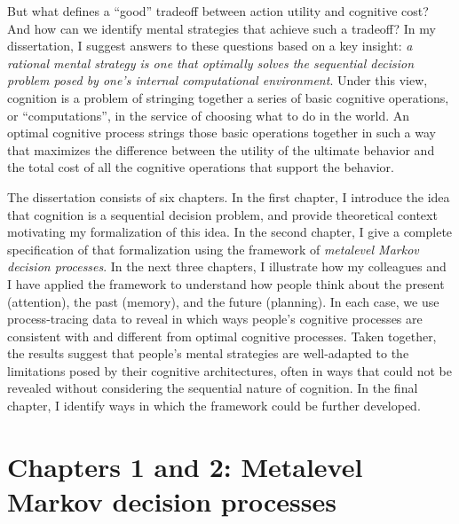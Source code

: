 \documentclass[dsingle]{memo}
\begin{document}
But what defines a ``good'' tradeoff between action utility and cognitive cost? And how can we identify mental strategies that achieve such a tradeoff? In my dissertation, I suggest answers to these questions based on a key insight: \emph{a rational mental strategy is one that optimally solves the sequential decision problem posed by one's internal computational environment}. Under this view, cognition is a problem of stringing together a series of basic cognitive operations, or ``computations'', in the service of choosing what to do in the world. An optimal cognitive process strings those basic operations together in such a way that maximizes the difference between the utility of the ultimate behavior and the total cost of all the cognitive operations that support the behavior.

The dissertation consists of six chapters. In the first chapter, I introduce the idea that cognition is a sequential decision problem, and provide theoretical context motivating my formalization of this idea. In the second chapter, I give a complete specification of that formalization using the framework of \emph{metalevel Markov decision processes}. In the next three chapters, I illustrate how my colleagues and I have applied the framework to understand how people think about the present (attention), the past (memory), and the future (planning). In each case, we use process-tracing data to reveal in which ways people's cognitive processes are consistent with and different from optimal cognitive processes. Taken together, the results suggest that people's mental strategies are well-adapted to the limitations posed by their cognitive architectures, often in ways that could not be revealed without considering the sequential nature of cognition. In the final chapter, I identify ways in which the framework could be further developed.


\section{Chapters 1 and 2: Metalevel Markov decision processes}\label{formal-framework-metalevel-mdps}
\end{document}
